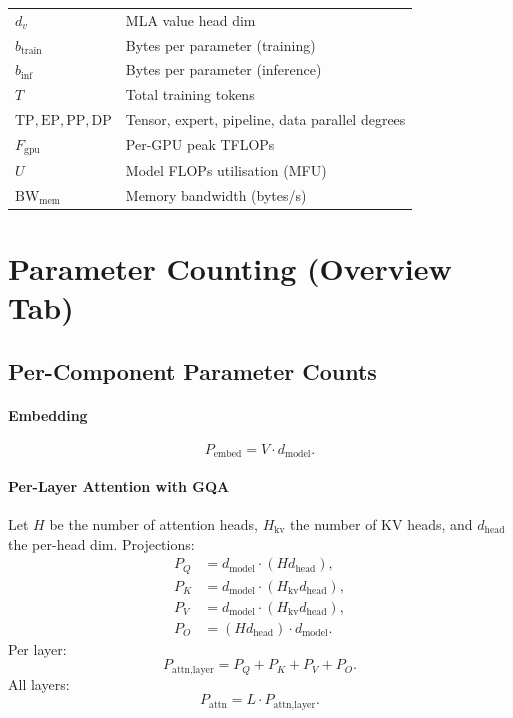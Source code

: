 \documentclass[11pt]{article}
\begin{document}
\begin{tabular}{ll}
$d_v$ & MLA value head dim \\
$b_{\text{train}}$ & Bytes per parameter (training) \\
$b_{\text{inf}}$ & Bytes per parameter (inference) \\
$T$ & Total training tokens \\
$\mathrm{TP},\mathrm{EP},\mathrm{PP},\mathrm{DP}$ & Tensor, expert, pipeline, data parallel degrees \\
$F_{\text{gpu}}$ & Per-GPU peak TFLOPs \\
$U$ & Model FLOPs utilisation (MFU) \\
$\mathrm{BW}_{\text{mem}}$ & Memory bandwidth (bytes/s) \\
\bottomrule
\end{tabular}

\section{Parameter Counting (Overview Tab)}

\subsection{Per-Component Parameter Counts}

\paragraph{Embedding}
\[
P_{\text{embed}} = V \cdot d_{\text{model}}.
\]

\paragraph{Per-Layer Attention with GQA}
Let $H$ be the number of attention heads, $H_{\text{kv}}$ the number of KV heads,
and $d_{\text{head}}$ the per-head dim. Projections:
\begin{align*}
P_Q &= d_{\text{model}} \cdot (H d_{\text{head}}), \\
P_K &= d_{\text{model}} \cdot (H_{\text{kv}} d_{\text{head}}), \\
P_V &= d_{\text{model}} \cdot (H_{\text{kv}} d_{\text{head}}), \\
P_O &= (H d_{\text{head}}) \cdot d_{\text{model}}.
\end{align*}
Per layer:
\[
P_{\text{attn,layer}} = P_Q + P_K + P_V + P_O.
\]
All layers:
\[
P_{\text{attn}} = L \cdot P_{\text{attn,layer}}.
\]
\end{document}
